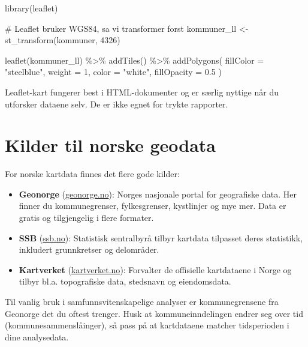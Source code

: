 \documentclass[
  norsk,
  letterpaper,
  DIV=11,
  numbers=noendperiod]{scrreprt}
\newenvironment{Shaded}{\begin{snugshade}}{\end{snugshade}}
\newcommand{\AttributeTok}[1]{\textcolor[rgb]{0.40,0.45,0.13}{#1}}
\newcommand{\CommentTok}[1]{\textcolor[rgb]{0.37,0.37,0.37}{#1}}
\newcommand{\DecValTok}[1]{\textcolor[rgb]{0.68,0.00,0.00}{#1}}
\newcommand{\FloatTok}[1]{\textcolor[rgb]{0.68,0.00,0.00}{#1}}
\newcommand{\FunctionTok}[1]{\textcolor[rgb]{0.28,0.35,0.67}{#1}}
\newcommand{\NormalTok}[1]{\textcolor[rgb]{0.00,0.23,0.31}{#1}}
\newcommand{\OtherTok}[1]{\textcolor[rgb]{0.00,0.23,0.31}{#1}}
\newcommand{\SpecialCharTok}[1]{\textcolor[rgb]{0.37,0.37,0.37}{#1}}
\newcommand{\StringTok}[1]{\textcolor[rgb]{0.13,0.47,0.30}{#1}}
\providecommand{\tightlist}{%
  \setlength{\itemsep}{0pt}\setlength{\parskip}{0pt}}
\theoremstyle{definition}
\theoremstyle{remark}
\begin{document}
\begin{Shaded}
\begin{Highlighting}[]
\FunctionTok{library}\NormalTok{(leaflet)}

\CommentTok{\# Leaflet bruker WGS84, sa vi transformer forst}
\NormalTok{kommuner\_ll }\OtherTok{\textless{}{-}} \FunctionTok{st\_transform}\NormalTok{(kommuner, }\DecValTok{4326}\NormalTok{)}

\FunctionTok{leaflet}\NormalTok{(kommuner\_ll) }\SpecialCharTok{\%\textgreater{}\%}
  \FunctionTok{addTiles}\NormalTok{() }\SpecialCharTok{\%\textgreater{}\%}
  \FunctionTok{addPolygons}\NormalTok{(}
    \AttributeTok{fillColor =} \StringTok{"steelblue"}\NormalTok{,}
    \AttributeTok{weight =} \DecValTok{1}\NormalTok{,}
    \AttributeTok{color =} \StringTok{"white"}\NormalTok{,}
    \AttributeTok{fillOpacity =} \FloatTok{0.5}
\NormalTok{  )}
\end{Highlighting}
\end{Shaded}

Leaflet-kart fungerer best i HTML-dokumenter og er særlig nyttige når du
utforsker dataene selv. De er ikke egnet for trykte rapporter.

\section{Kilder til norske geodata}\label{kilder-til-norske-geodata}

For norske kartdata finnes det flere gode kilder:

\begin{itemize}
\tightlist
\item
  \textbf{Geonorge} (\href{https://www.geonorge.no/}{geonorge.no}):
  Norges nasjonale portal for geografiske data. Her finner du
  kommunegrenser, fylkesgrenser, kystlinjer og mye mer. Data er gratis
  og tilgjengelig i flere formater.
\item
  \textbf{SSB} (\href{https://www.ssb.no/kart/statistikkart}{ssb.no}):
  Statistisk sentralbyrå tilbyr kartdata tilpasset deres statistikk,
  inkludert grunnkretser og delområder.
\item
  \textbf{Kartverket}
  (\href{https://www.kartverket.no/}{kartverket.no}): Forvalter de
  offisielle kartdataene i Norge og tilbyr bl.a. topografiske data,
  stedsnavn og eiendomsdata.
\end{itemize}

Til vanlig bruk i samfunnsvitenskapelige analyser er kommunegrensene fra
Geonorge det du oftest trenger. Husk at kommuneinndelingen endrer seg
over tid (kommunesammenslåinger), så pass på at kartdataene matcher
tidsperioden i dine analysedata.
\end{document}
